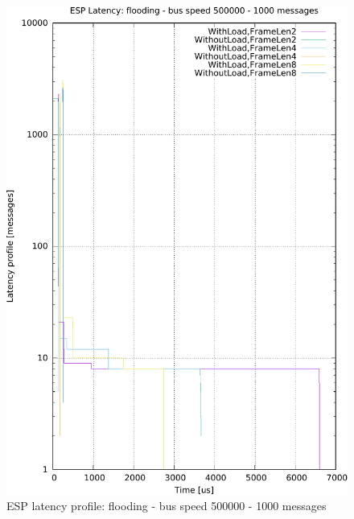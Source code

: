 \documentclass{ctuthesis}
\begin{document}
\begin{figure}[htb]
\includegraphics[width=\linewidth]{figures/speed500000_messages1000_floodTrue.pdf}
\caption{ESP latency profile: flooding - bus speed 500000 - 1000 messages}
\end{figure}
\end{document}
